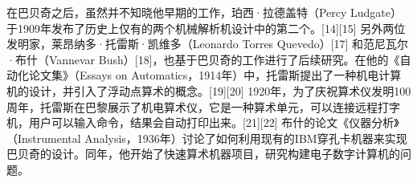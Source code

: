 在巴贝奇之后，虽然并不知晓他早期的工作，珀西·拉德盖特（Percy Ludgate）于1909年发布了历史上仅有的两个机械解析机设计中的第二个。[14][15] 另外两位发明家，莱昂纳多·托雷斯·凯维多（Leonardo Torres Quevedo）[17] 和范尼瓦尔·布什（Vannevar Bush）[18]，也基于巴贝奇的工作进行了后续研究。在他的《自动化论文集》（Essays on Automatics，1914年）中，托雷斯提出了一种机电计算机的设计，并引入了浮动点算术的概念。[19][20] 1920年，为了庆祝算术仪发明100周年，托雷斯在巴黎展示了机电算术仪，它是一种算术单元，可以连接远程打字机，用户可以输入命令，结果会自动打印出来。[21][22] 布什的论文《仪器分析》（Instrumental Analysis，1936年）讨论了如何利用现有的IBM穿孔卡机器来实现巴贝奇的设计。同年，他开始了快速算术机器项目，研究构建电子数字计算机的问题。